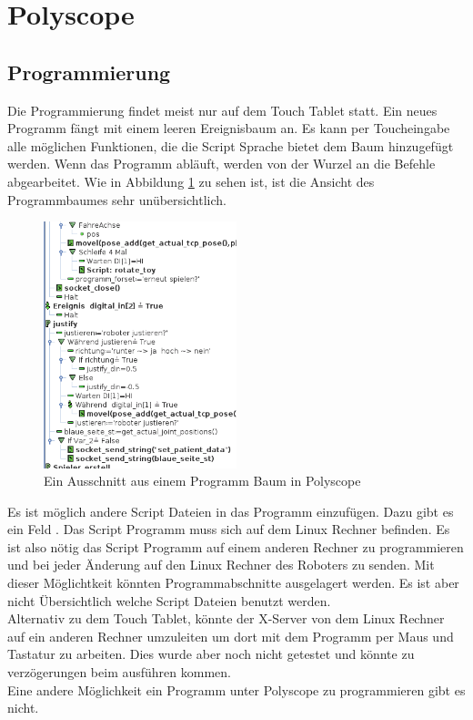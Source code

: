 \section{Polyscope}
\label{sec:Polyscope_rel}

\subsection{Programmierung}
\label{sub:programmierung_polyscope_rel}

Die Programmierung findet meist nur auf dem Touch Tablet statt. Ein neues Programm fängt mit einem leeren Ereignisbaum an. Es kann per Toucheingabe alle möglichen Funktionen, die die Script Sprache bietet dem Baum hinzugefügt werden. Wenn das Programm abläuft, werden von der Wurzel an die Befehle abgearbeitet.
Wie in Abbildung \ref{fig:programm_in_polyscope} zu sehen ist, ist die Ansicht des Programmbaumes sehr unübersichtlich.

\begin{figure}[H]
  \centering
    \includegraphics[width=0.5\textwidth]{pic/polyscope_program_tree.png}
      \caption[Programm Baum in Polyscope]{Ein Ausschnitt aus einem Programm Baum in Polyscope}
      \label{fig:programm_in_polyscope}
\end{figure}

Es ist möglich andere Script Dateien in das Programm einzufügen. Dazu gibt es ein Feld . Das Script Programm muss sich auf dem Linux Rechner befinden. Es ist also nötig das Script Programm auf einem anderen Rechner zu programmieren und bei jeder Änderung auf den Linux Rechner des Roboters zu senden. Mit dieser Möglichtkeit könnten Programmabschnitte ausgelagert werden. Es ist aber nicht Übersichtlich welche Script Dateien benutzt werden.\\
Alternativ zu dem Touch Tablet, könnte der X-Server von dem Linux Rechner auf ein anderen Rechner umzuleiten um dort mit dem Programm per Maus und Tastatur zu arbeiten. Dies wurde aber noch nicht getestet und könnte zu verzögerungen beim ausführen kommen.
\\
Eine andere Möglichkeit ein Programm unter Polyscope zu programmieren gibt es nicht.

